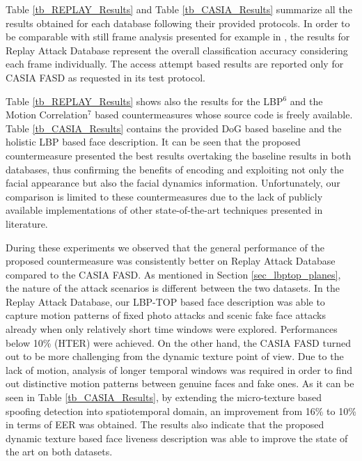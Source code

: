 Table \ref{tb_REPLAY_Results} and Table \ref{tb_CASIA_Results} summarize all the results obtained for each database following their provided protocols. In order to be comparable with still frame analysis presented for example in \cite{ChingovskaBIOSIG2012}, the results for Replay Attack Database represent the overall classification accuracy considering each frame individually. The access attempt based results are reported only for CASIA FASD as requested in its test protocol.

Table \ref{tb_REPLAY_Results} shows also the results for the LBP$^6$ \cite{ChingovskaBIOSIG2012} and the Motion Correlation$^7$ \cite{AnjosIJCB2011} based countermeasures whose source code is freely available. Table \ref{tb_CASIA_Results} contains the provided DoG based baseline and the holistic LBP based face description. It can be seen that the proposed countermeasure presented the best results overtaking the baseline results in both databases, thus confirming the benefits of encoding and exploiting not only the facial appearance but also the facial dynamics information. Unfortunately, our comparison is limited to these countermeasures due to the lack of publicly available implementations of other state-of-the-art techniques presented in literature. 

During these experiments we observed that the general performance of the proposed countermeasure was consistently better on Replay Attack Database compared to the CASIA FASD. As mentioned in Section \ref{sec_lbptop_planes}, the nature of the attack scenarios is different between the two datasets. In the Replay Attack Database, our LBP-TOP based face description was able to capture motion patterns of fixed photo attacks and scenic fake face attacks already when only relatively short time windows were explored. Performances below 10\% (HTER) were achieved. On the other hand, the CASIA FASD turned out to be more challenging from the dynamic texture point of view. Due to the lack of motion, analysis of longer temporal windows was required in order to find out distinctive motion patterns between genuine faces and fake ones. As it can be seen in Table \ref{tb_CASIA_Results}, by extending the micro-texture based spoofing detection into spatiotemporal domain, an improvement from 16\% to 10\% in terms of EER was obtained. The results also indicate that the proposed dynamic texture based face liveness description was able to improve the state of the art on both datasets.



